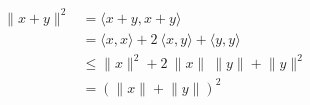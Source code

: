 \documentclass[preview]{standalone}
\begin{document}
\begin{align*}
\lVert x + y \rVert ^{2} & = \langle x+y, x+y \rangle \\& = \langle x, x \rangle + 2 \ \langle x, y \rangle + \langle y, y \rangle \\& \leq \lVert x \rVert ^{2} + 2 \ \lVert x \rVert \ \lVert y \rVert + \lVert  y \rVert ^{2} \\&  = (\lVert x \rVert + \lVert  y \rVert)^{2}
\end{align*}
\end{document}
